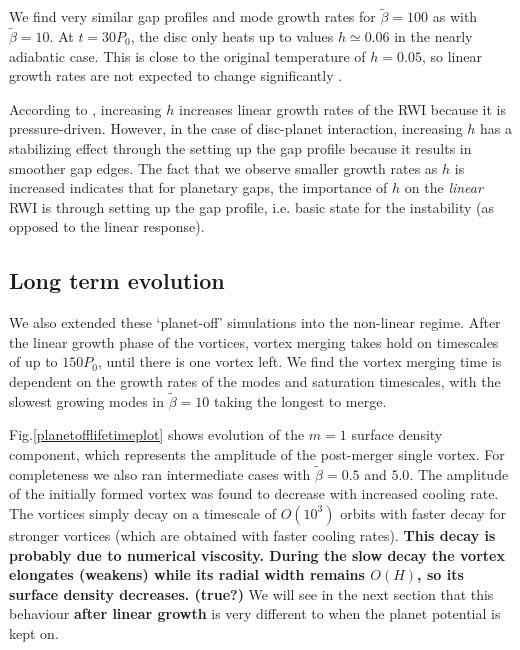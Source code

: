 We find very similar gap profiles and mode growth rates for
$\tilde{\beta}=100$ as with $\tilde{\beta}=10$. At $t=30P_0$, the disc only heats up to
values $h\simeq0.06$ in the nearly adiabatic case. This is close to
the original temperature of $h=0.05$, so linear growth rates are not expected
to change significantly \citep{li00}. 

According to \cite{li00}, increasing $h$ increases linear growth rates
of the RWI because it is pressure-driven. However, in the case 
of disc-planet interaction, increasing $h$ has a stabilizing effect
through the setting up the gap profile because it results in smoother gap
edges. The fact that we observe smaller growth rates as $h$ is
increased indicates that for planetary gaps, the importance of $h$ on
the \emph{linear} RWI is through setting up the gap profile, i.e. basic
state for the instability (as opposed to the linear response). 

\subsection{Long term evolution} \label{nonlinearplanetoff} 

We also extended these `planet-off' simulations into the non-linear
regime. After the linear growth phase of the vortices, vortex merging
takes hold on timescales of up to $150P_0$, until there is one vortex
left. We find the vortex merging
time is dependent on the growth rates of the modes and saturation
timescales, with the slowest growing modes in $\tilde\beta=10$ taking
the longest to merge.  

Fig.\ref{planetofflifetimeplot} shows evolution of the $m=1$ surface
density component, which represents the amplitude of the post-merger
single vortex. For completeness we also ran intermediate cases with
$\tilde{\beta}=0.5$ and $5.0$. The amplitude of the initially formed vortex was 
found to decrease with increased cooling rate. The vortices simply decay on a
timescale of $O(10^3)$ orbits with faster decay for stronger vortices
(which are obtained with faster cooling rates). {\bf This decay is 
  probably due to numerical viscosity. During the slow decay the
  vortex elongates (weakens) while its radial width remains $O(H)$, so
  its surface density decreases. (true?)} 
We will see in the
next section that this behaviour {\bf after linear growth} is very
different to when the planet potential is kept on. 

